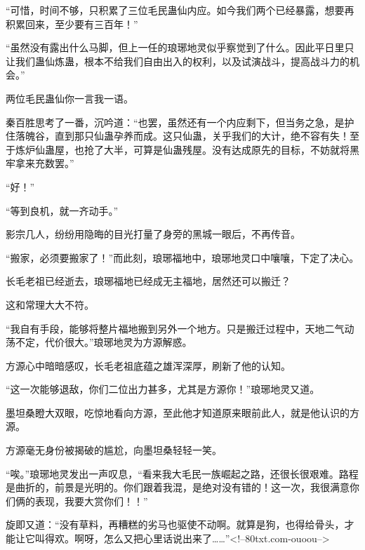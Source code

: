 \begin{this_body}
“可惜，时间不够，只积累了三位毛民蛊仙内应。如今我们两个已经暴露，想要再积累回来，至少要有三百年！”

“虽然没有露出什么马脚，但上一任的琅琊地灵似乎察觉到了什么。因此平日里只让我们蛊仙炼蛊，根本不给我们自由出入的权利，以及试演战斗，提高战斗力的机会。”

两位毛民蛊仙你一言我一语。

秦百胜思考了一番，沉吟道：“也罢，虽然还有一个内应剩下，但当务之急，是护住落魄谷，直到那只仙蛊孕养而成。这只仙蛊，关乎我们的大计，绝不容有失！至于炼炉仙蛊屋，也抢了大半，可算是仙蛊残屋。没有达成原先的目标，不妨就将黑牢拿来充数罢。”

“好！”

“等到良机，就一齐动手。”

影宗几人，纷纷用隐晦的目光打量了身旁的黑城一眼后，不再传音。

“搬家，必须要搬家了！”而此刻，琅琊福地中，琅琊地灵口中嚷嚷，下定了决心。

长毛老祖已经逝去，琅琊福地已经成无主福地，居然还可以搬迁？

这和常理大大不符。

“我自有手段，能够将整片福地搬到另外一个地方。只是搬迁过程中，天地二气动荡不定，代价很大。”琅琊地灵为方源解惑。

方源心中暗暗感叹，长毛老祖底蕴之雄浑深厚，刷新了他的认知。

“这一次能够退敌，你们二位出力甚多，尤其是方源你！”琅琊地灵又道。

墨坦桑瞪大双眼，吃惊地看向方源，至此他才知道原来眼前此人，就是他认识的方源。

方源毫无身份被揭破的尴尬，向墨坦桑轻轻一笑。

“唉。”琅琊地灵发出一声叹息，“看来我大毛民一族崛起之路，还很长很艰难。路程是曲折的，前景是光明的。你们跟着我混，是绝对没有错的！这一次，我很满意你们俩的表现，我要大赏你们！！”

旋即又道：“没有草料，再糟糕的劣马也驱使不动啊。就算是狗，也得给骨头，才能让它叫得欢。啊呀，怎么又把心里话说出来了……”<!--80txt.com-ouoou-->

\end{this_body}

